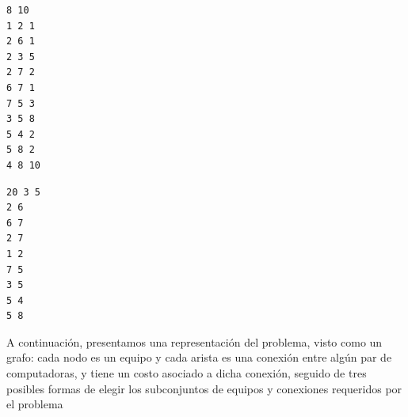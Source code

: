 \documentclass[11pt, a4paper, twoside]{article}
\begin{document}
\begin{minipage}[t]{0.4\textwidth}
\begin{Verbatim}[frame=single,framesep=1cm,label= Ejemplo de entrada: instancia 1]
8 10
1 2 1
2 6 1
2 3 5
2 7 2
6 7 1
7 5 3
3 5 8
5 4 2
5 8 2
4 8 10
\end{Verbatim}
\end{minipage}
\hfill
\begin{minipage}[t]{0.4\textwidth}
\begin{Verbatim}[frame=single,framesep=1cm,label= Ejemplo de salida: instancia 1]
20 3 5
2 6
6 7
2 7
1 2
7 5
3 5
5 4
5 8
\end{Verbatim}
\end{minipage}

A continuación, presentamos una representación del problema, visto como 
un grafo: cada nodo es un equipo y cada arista es una conexión entre 
algún par de computadoras, y tiene un costo asociado a dicha conexión, 
seguido de tres posibles formas de elegir los subconjuntos de equipos y 
conexiones requeridos por el problema
\end{document}
